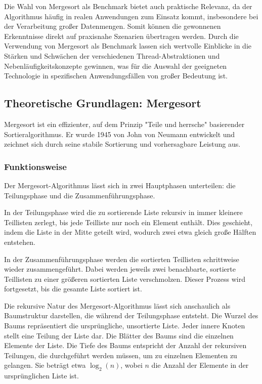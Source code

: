 \documentclass[fontsize=12pt,paper=a4,twoside=semi,parskip=half-,headsepline,headinclude]{scrreprt}
\begin{document}
Die Wahl von Mergesort als Benchmark bietet auch praktische Relevanz, da der Algorithmus häufig in realen Anwendungen zum Einsatz kommt, insbesondere bei der Verarbeitung großer Datenmengen. Somit können die gewonnenen Erkenntnisse direkt auf praxisnahe Szenarien übertragen werden. Durch die Verwendung von Mergesort als Benchmark lassen sich wertvolle Einblicke in die Stärken und Schwächen der verschiedenen Thread-Abstraktionen und Nebenläufigkeitskonzepte gewinnen, was für die Auswahl der geeigneten Technologie in spezifischen Anwendungsfällen von großer Bedeutung ist.

\subsection{Theoretische Grundlagen: Mergesort}

Mergesort ist ein effizienter, auf dem Prinzip "Teile und herrsche" basierender Sortieralgorithmus. Er wurde 1945 von John von Neumann entwickelt \cite{vonNeumann1945} und zeichnet sich durch seine stabile Sortierung und vorhersagbare Leistung aus.

\subsubsection{Funktionsweise}

Der Mergesort-Algorithmus lässt sich in zwei Hauptphasen unterteilen: die Teilungsphase und die Zusammenführungsphase.

In der Teilungsphase wird die zu sortierende Liste rekursiv in immer kleinere Teillisten zerlegt, bis jede Teilliste nur noch ein Element enthält. Dies geschieht, indem die Liste in der Mitte geteilt wird, wodurch zwei etwa gleich große Hälften entstehen.

In der Zusammenführungsphase werden die sortierten Teillisten schrittweise wieder zusammengeführt. Dabei werden jeweils zwei benachbarte, sortierte Teillisten zu einer größeren sortierten Liste verschmolzen. Dieser Prozess wird fortgesetzt, bis die gesamte Liste sortiert ist.

Die rekursive Natur des Mergesort-Algorithmus lässt sich anschaulich als Baumstruktur darstellen, die während der Teilungsphase entsteht. Die Wurzel des Baums repräsentiert die ursprüngliche, unsortierte Liste. Jeder innere Knoten stellt eine Teilung der Liste dar. Die Blätter des Baums sind die einzelnen Elemente der Liste. Die Tiefe des Baums entspricht der Anzahl der rekursiven Teilungen, die durchgeführt werden müssen, um zu einzelnen Elementen zu gelangen. Sie beträgt etwa $\log_2(n)$, wobei $n$ die Anzahl der Elemente in der ursprünglichen Liste ist.
\end{document}
